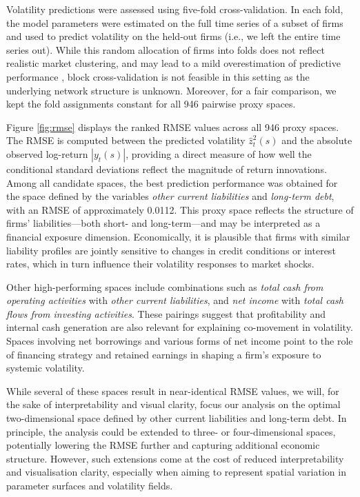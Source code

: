 \documentclass[fleqn,11pt]{article}
\begin{document}
Volatility predictions were assessed using five-fold cross-validation. In each fold, the model parameters were estimated on the full time series of a subset of firms and used to predict volatility on the held-out firms (i.e., we left the entire time series out). While this random allocation of firms into folds does not reflect realistic market clustering, and may lead to a mild overestimation of predictive performance \cite{otto2024review_CV}, block cross-validation is not feasible in this setting as the underlying network structure is unknown. Moreover, for a fair comparison, we kept the fold assignments constant for all 946 pairwise proxy spaces. 

Figure \ref{fig:rmse} displays the ranked RMSE values across all 946 proxy spaces. The RMSE is computed between the predicted volatility $\hat{z}^2_t(s)$ and the absolute observed log-return $|y_t(s)|$, providing a direct measure of how well the conditional standard deviations reflect the magnitude of return innovations. Among all candidate spaces, the best prediction performance was obtained for the space defined by the variables \emph{other current liabilities} and \emph{long-term debt}, with an RMSE of approximately 0.0112. This proxy space reflects the structure of firms’ liabilities—both short- and long-term—and may be interpreted as a financial exposure dimension. Economically, it is plausible that firms with similar liability profiles are jointly sensitive to changes in credit conditions or interest rates, which in turn influence their volatility responses to market shocks.

Other high-performing spaces include combinations such as \emph{total cash from operating activities} with \emph{other current liabilities}, and \emph{net income} with \emph{total cash flows from investing activities}. These pairings suggest that profitability and internal cash generation are also relevant for explaining co-movement in volatility. Spaces involving net borrowings and various forms of net income point to the role of financing strategy and retained earnings in shaping a firm’s exposure to systemic volatility.

While several of these spaces result in near-identical RMSE values, we will, for the sake of interpretability and visual clarity, focus our analysis on the optimal two-dimensional space defined by other current liabilities and long-term debt. In principle, the analysis could be extended to three- or four-dimensional spaces, potentially lowering the RMSE further and capturing additional economic structure. However, such extensions come at the cost of reduced interpretability and visualisation clarity, especially when aiming to represent spatial variation in parameter surfaces and volatility fields.
\end{document}
